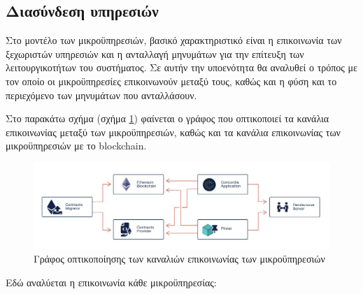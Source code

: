 \subsection{Διασύνδεση υπηρεσιών} \label{subsection:4-3-8-service-communication}

Στο μοντέλο των μικροϋπηρεσιών, βασικό χαρακτηριστικό είναι η επικοινωνία των ξεχωριστών υπηρεσιών και η ανταλλαγή μηνυμάτων για την επίτευξη των λειτουργικοτήτων του συστήματος. Σε αυτήν την υποενότητα θα αναλυθεί ο τρόπος με τον οποίο οι μικροϋπηρεσίες επικοινωνούν μεταξύ τους, καθώς και η φύση και το περιεχόμενο των μηνυμάτων που ανταλλάσουν.

Στο παρακάτω σχήμα (σχήμα \ref{figure:4-3-communications-graph}) φαίνεται ο γράφος που οπτικοποιεί τα κανάλια επικοινωνίας μεταξύ των μικροϋπηρεσιών, καθώς και τα κανάλια επικοινωνίας των μικροϋπηρεσιών με το blockchain.

\begin{figure}[H]
    \centering
    \includegraphics[width=\textwidth]{assets/figures/chapter-4/4.3.communications-diagram.png}
    \caption{Γράφος οπτικοποίησης των καναλιών επικοινωνίας των μικροϋπηρεσιών}
    \label{figure:4-3-communications-graph}
\end{figure}

Εδώ αναλύεται η επικοινωνία κάθε μικροϋπηρεσίας:

